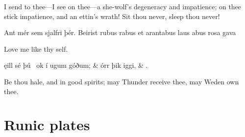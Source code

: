 \bvb I send to thee—I see on thee—a she-wolf’s degeneracy and impatience; on thee stick impatience, and an ettin’s wrath! Sit thou never, sleep thou never!\evb
\evg


\bvg
\bva[D]Ant mér sem sjalfri þér. Beirist rubus rabus et arantabus laus abus rosa gava\eva

\bvb Love me like thy self.\evb
\evg

\sectionline

\bvg
\bva[]ęill sé þú \hld\ ok í ugum góðum; &
\ind {}órr þik iggi, &
\ind {}.\eva

\bvb Be thou hale, and in good spirits; may Thunder receive thee, may Weden own thee.\evb
\evg


\section{Runic plates}

